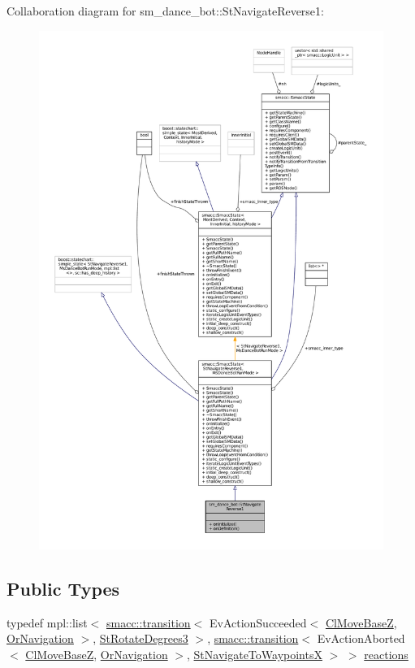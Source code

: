Collaboration diagram for sm\+\_\+dance\+\_\+bot\+:\+:St\+Navigate\+Reverse1\+:
\nopagebreak
\begin{figure}[H]
\begin{center}
\leavevmode
\includegraphics[width=350pt]{structsm__dance__bot_1_1StNavigateReverse1__coll__graph}
\end{center}
\end{figure}
\subsection*{Public Types}
\begin{DoxyCompactItemize}
\item 
typedef mpl\+::list$<$ \hyperlink{classsmacc_1_1transition}{smacc\+::transition}$<$ Ev\+Action\+Succeeded$<$ \hyperlink{classmove__base__z__client_1_1ClMoveBaseZ}{Cl\+Move\+BaseZ}, \hyperlink{classsm__dance__bot_1_1OrNavigation}{Or\+Navigation} $>$, \hyperlink{structsm__dance__bot_1_1StRotateDegrees3}{St\+Rotate\+Degrees3} $>$, \hyperlink{classsmacc_1_1transition}{smacc\+::transition}$<$ Ev\+Action\+Aborted$<$ \hyperlink{classmove__base__z__client_1_1ClMoveBaseZ}{Cl\+Move\+BaseZ}, \hyperlink{classsm__dance__bot_1_1OrNavigation}{Or\+Navigation} $>$, \hyperlink{structsm__dance__bot_1_1StNavigateToWaypointsX}{St\+Navigate\+To\+WaypointsX} $>$ $>$ \hyperlink{structsm__dance__bot_1_1StNavigateReverse1_ad56d6535dba677953cee3fad9d47d52b}{reactions}
\end{DoxyCompactItemize}
